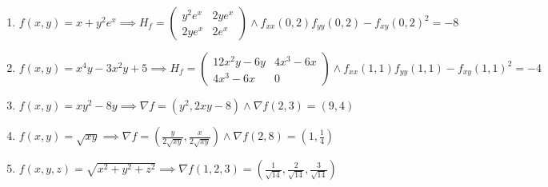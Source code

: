 \documentclass[11pt,a4paper]{article}
\begin{document}
\begin{enumerate}
\item $\displaystyle f(x, y) = x + y^{2} e^{x} \implies H_{f} = \begin{pmatrix} y^{2} e^{x} & 2y e^{x} \\ 2y e^{x} & 2e^{x} \end{pmatrix} \land f_{xx}(0, 2) f_{yy}(0, 2) - f_{xy}(0, 2)^{2} = -8$
\item $\displaystyle f(x, y) = x^{4} y - 3x^{2} y + 5 \implies H_{f} = \begin{pmatrix} 12x^{2} y - 6y & 4x^{3} - 6x \\ 4x^{3} - 6x & 0 \end{pmatrix} \land f_{xx}(1, 1) f_{yy}(1, 1) - f_{xy}(1, 1)^{2} = -4$
\item $\displaystyle f(x, y) = xy^{2} - 8y \implies \nabla f = \left( y^{2}, 2xy - 8 \right) \land \nabla f(2, 3) = (9, 4)$
\item $\displaystyle f(x, y) = \sqrt{xy} \implies \nabla f = \left( \frac{y}{2\sqrt{xy}}, \frac{x}{2\sqrt{xy}} \right) \land \nabla f(2, 8) = \left( 1, \frac{1}{4} \right)$
\item $\displaystyle f(x, y, z) = \sqrt{x^{2} + y^{2} + z^{2}} \implies \nabla f(1, 2, 3) = \left( \frac{1}{\sqrt{14}}, \frac{2}{\sqrt{14}}, \frac{3}{\sqrt{14}} \right)$
\end{enumerate}
\end{document}

